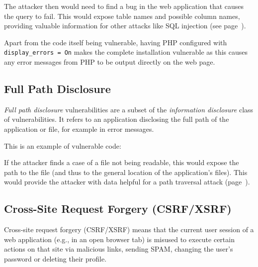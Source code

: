 The attacker then would need to find a bug in the web application that causes the query to fail. This would expose table names and possible column names, providing valuable information for other attacks like SQL injection (see page~\pageref{sql-injection}).

Apart from the code itself being vulnerable, having PHP configured with \texttt{display\_errors = On} makes the complete installation vulnerable as this causes any error messages from PHP to be output directly on the web page.


\subsection{Full Path Disclosure}
\label{path-disclosure}
\emph{Full path disclosure} vulnerabilities are a subset of the \emph{information disclosure} class of vulnerabilities. It refers to an application disclosing the full path of the application or file, for example in error messages.

This is an example of vulnerable code:


If the attacker finds a case of a file not being readable, this would expose the path to the file (and thus to the general location of the application's files).  This would provide the attacker with data helpful for a path traversal attack (page~\pageref{directory-traversal}).


\subsection{Cross-Site Request Forgery (CSRF/XSRF)}
\label{xscr,csrf}
Cross-site request forgery (CSRF/XSRF) means that the current user session of a web application (e.g., in an open browser tab) is misused to execute certain actions on that site via malicious links, \eg sending SPAM, changing the user's password or deleting their profile.

